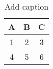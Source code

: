 \begin{table}[htbp]
  \centering
  \caption{Add caption}
    \begin{tabular}{c|c|c}
    A     & B     & C \bigstrut[b]\\
    \hline
    1     & 2     & 3 \bigstrut\\
    \hline
    4     & 5     & 6 \bigstrut[t]\\
    \end{tabular}%
  \label{tab:addlabel}%
\end{table}%
